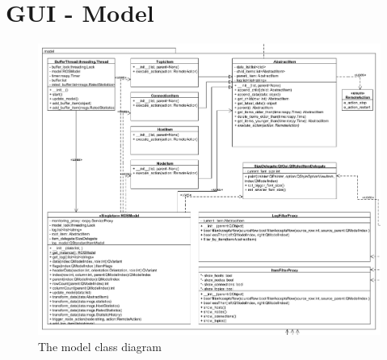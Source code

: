 



\section{GUI - Model}
\begin{figure}[!ht]
\begin{center}
\includegraphics[width=1.0\linewidth]{./diagram_pictures/model.png}
\caption{The model class diagram}
\end{center}
\end{figure}

\newpage
